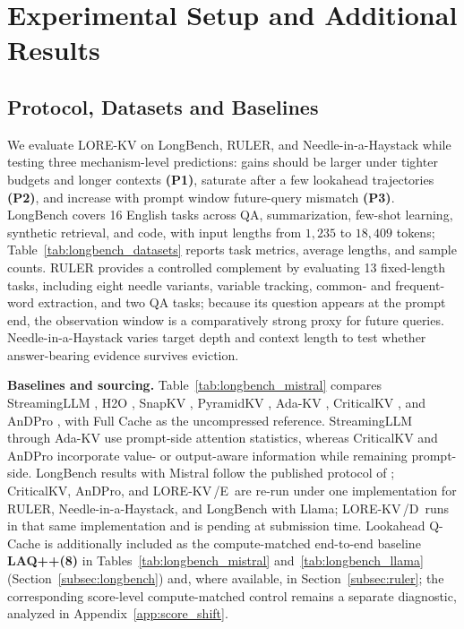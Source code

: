 \documentclass{article} %
\newcommand{\lorekvE}{LORE-KV\,/E}
\newcommand{\lorekvD}{LORE-KV\,/D}
\begin{document}
\section{Experimental Setup and Additional Results}
\label{app:experimental_details}

\subsection{Protocol, Datasets and Baselines}\label{app:datasets}
We evaluate LORE-KV on LongBench, RULER, and Needle-in-a-Haystack while testing three mechanism-level predictions: gains should be larger under tighter budgets and longer contexts \textbf{(P1)}, saturate after a few lookahead trajectories \textbf{(P2)}, and increase with prompt window future-query mismatch \textbf{(P3)}. LongBench covers 16 English tasks across QA, summarization, few-shot learning, synthetic retrieval, and code, with input lengths from $1{,}235$ to $18{,}409$ tokens; Table~\ref{tab:longbench_datasets} reports task metrics, average lengths, and sample counts. RULER provides a controlled complement by evaluating 13 fixed-length tasks, including eight needle variants, variable tracking, common- and frequent-word extraction, and two QA tasks; because its question appears at the prompt end, the observation window is a comparatively strong proxy for future queries. Needle-in-a-Haystack varies target depth and context length to test whether answer-bearing evidence survives eviction.

\textbf{Baselines and sourcing.}
Table~\ref{tab:longbench_mistral} compares StreamingLLM \citep{xiao2023streamingllm}, H2O \citep{zhang2023h2o}, SnapKV \citep{li2024snapkv}, PyramidKV \citep{cai2024pyramidkv}, Ada-KV \citep{feng2024adakv}, CriticalKV \citep{guo2024criticalkv}, and AnDPro \citep{geng2026accurate}, with Full Cache as the uncompressed reference. StreamingLLM through Ada-KV use prompt-side attention statistics, whereas CriticalKV and AnDPro incorporate value- or output-aware information while remaining prompt-side. LongBench results with Mistral follow the published protocol of \citet{geng2026accurate}; CriticalKV, AnDPro, and \lorekvE\ are re-run under one implementation for RULER, Needle-in-a-Haystack, and LongBench with Llama; \lorekvD\ runs in that same implementation and is pending at submission time. Lookahead Q-Cache \citep{wang2025lookahead} is additionally included as the compute-matched end-to-end baseline \textbf{LAQ++(8)} in Tables~\ref{tab:longbench_mistral} and~\ref{tab:longbench_llama} (Section~\ref{subsec:longbench}) and, where available, in Section~\ref{subsec:ruler}; the corresponding score-level compute-matched control remains a separate diagnostic, analyzed in Appendix~\ref{app:score_shift}.
\end{document}
